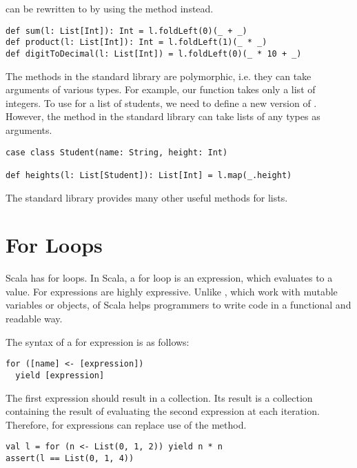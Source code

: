  can be rewritten to  by using the
 method instead.

\begin{verbatim}
def sum(l: List[Int]): Int = l.foldLeft(0)(_ + _)
def product(l: List[Int]): Int = l.foldLeft(1)(_ * _)
def digitToDecimal(l: List[Int]) = l.foldLeft(0)(_ * 10 + _)
\end{verbatim}

The methods in the standard library are polymorphic, i.e. they can take
arguments of various types. For example, our  function takes only a
list of integers. To use  for a list of students, we need to define a
new version of . However, the  method in the standard
library can take lists of any types as arguments.

\begin{verbatim}
case class Student(name: String, height: Int)

def heights(l: List[Student]): List[Int] = l.map(_.height)
\end{verbatim}

The standard library provides many other useful methods for
lists.

\section{For Loops}

Scala has for loops.
In Scala, a for loop is an expression, which evaluates to a value.
For expressions are highly expressive.
Unlike , which work with mutable variables or objects,
 of Scala helps programmers to write code in a functional and readable way.

The syntax of a for expression is as follows:

\begin{verbatim}
for ([name] <- [expression])
  yield [expression]
\end{verbatim}

The first expression should result in a collection.
Its result is a collection containing the result of evaluating the second expression
at each iteration.
Therefore, for expressions can replace use of the  method.

\begin{verbatim}
val l = for (n <- List(0, 1, 2)) yield n * n
assert(l == List(0, 1, 4))
\end{verbatim}

